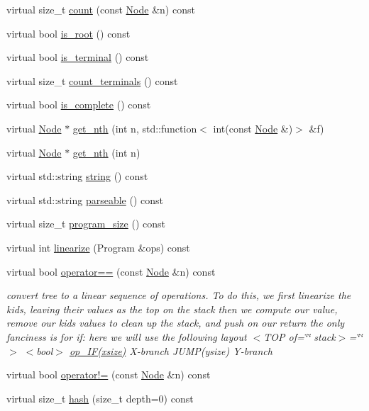 \begin{DoxyCompactItemize}
\item 
virtual size\+\_\+t \hyperlink{class_node_a0cc58478d98361566830a8d3db745718}{count} (const \hyperlink{class_node}{Node} \&n) const
\item 
virtual bool \hyperlink{class_node_ad12a96da2fe796616aa22e20429f41d5}{is\+\_\+root} () const
\item 
virtual bool \hyperlink{class_node_ac3c263a4e0c734c34aaf62f80f84cd9a}{is\+\_\+terminal} () const
\item 
virtual size\+\_\+t \hyperlink{class_node_a70c820eaeaa852e3c0a46cf006026c1b}{count\+\_\+terminals} () const
\item 
virtual bool \hyperlink{class_node_ac2e36754ba8b1b1d452deeb2bdbd346f}{is\+\_\+complete} () const
\item 
virtual \hyperlink{class_node}{Node} $\ast$ \hyperlink{class_node_a93fc84b584f080593978d3a39631d3e5}{get\+\_\+nth} (int n, std\+::function$<$ int(const \hyperlink{class_node}{Node} \&)$>$ \&f)
\item 
virtual \hyperlink{class_node}{Node} $\ast$ \hyperlink{class_node_a224c0ee6dae35ddce70f8fd3b91e0b1c}{get\+\_\+nth} (int n)
\item 
virtual std\+::string \hyperlink{class_node_a0590ae269543416be9c4ebdf70bad73b}{string} () const
\item 
virtual std\+::string \hyperlink{class_node_a70e879ceb71f47787137572d9bee8efa}{parseable} () const
\item 
virtual size\+\_\+t \hyperlink{class_node_a377548bcf1be99ac5181f9434c33c81e}{program\+\_\+size} () const
\item 
virtual int \hyperlink{class_node_a54676f34db2c299693c9b55148589230}{linearize} (Program \&ops) const
\item 
virtual bool \hyperlink{class_node_a90aeee00ccda27f36bea9cdd774eae8d}{operator==} (const \hyperlink{class_node}{Node} \&n) const
\begin{DoxyCompactList}\small\item\em convert tree to a linear sequence of operations. To do this, we first linearize the kids, leaving their values as the top on the stack then we compute our value, remove our kids\textquotesingle{} values to clean up the stack, and push on our return the only fanciness is for if\+: here we will use the following layout $<$\+T\+O\+P of=\char`\"{}\char`\"{} stack$>$=\char`\"{}\char`\"{}$>$ $<$bool$>$ \hyperlink{_instruction_8h_af2fb7c87c5854c5733d7bb0506b06de7a8f69a9fe993189d72cf7b07e8517801d}{op\+\_\+\+I\+F(xsize)} X-\/branch J\+U\+M\+P(ysize) Y-\/branch \end{DoxyCompactList}\item 
virtual bool \hyperlink{class_node_a1ff12be4d2355edddee1fbe893f0c8a8}{operator!=} (const \hyperlink{class_node}{Node} \&n) const
\item 
virtual size\+\_\+t \hyperlink{class_node_a212f2e1ba4ff71de6954b0b791d89979}{hash} (size\+\_\+t depth=0) const
\end{DoxyCompactItemize}
